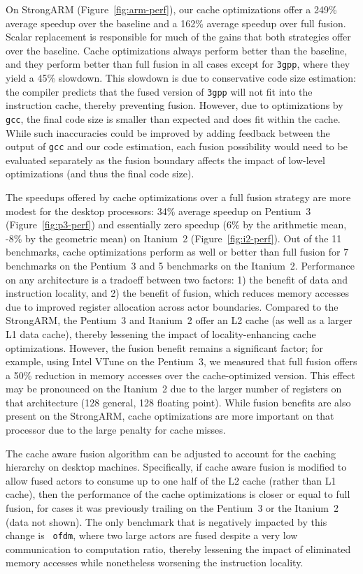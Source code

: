 \documentclass{sigplanconf}
\begin{document}
On StrongARM (Figure~\ref{fig:arm-perf}), our cache optimizations
offer a 249\% average speedup over the baseline and a 162\% average
speedup over full fusion.  Scalar replacement is responsible for much
of the gains that both strategies offer over the baseline.  Cache
optimizations always perform better than the baseline, and they
perform better than full fusion in all cases except for \texttt{3gpp},
where they yield a 45\% slowdown.  This slowdown is due to
conservative code size estimation: the compiler predicts that the
fused version of \texttt{3gpp} will not fit into the instruction
cache, thereby preventing fusion.  However, due to optimizations by
{\tt gcc}, the final code size is smaller than expected and does fit
within the cache.  While such inaccuracies could be improved by adding
feedback between the output of {\tt gcc} and our code estimation, each
fusion possibility would need to be evaluated separately as the fusion
boundary affects the impact of low-level optimizations (and thus the
final code size).

The speedups offered by cache optimizations over a full fusion
strategy are more modest for the desktop processors: 34\% average
speedup on Pentium~3 (Figure~\ref{fig:p3-perf}) and essentially zero
speedup (6\% by the arithmetic mean, -8\% by the geometric mean) on
Itanium~2 (Figure~\ref{fig:i2-perf}).  Out of the 11 benchmarks, cache
optimizations perform as well or better than full fusion for 7
benchmarks on the Pentium~3 and 5 benchmarks on the Itanium~2.
Performance on any architecture is a tradoeff between two factors: 1)
the benefit of data and instruction locality, and 2) the benefit of
fusion, which reduces memory accesses due to improved register
allocation across actor boundaries.  Compared to the StrongARM, the
Pentium~3 and Itanium~2 offer an L2 cache (as well as a larger L1 data
cache), thereby lessening the impact of locality-enhancing cache
optimizations.  However, the fusion benefit remains a significant
factor; for example, using Intel VTune on the Pentium~3, we measured
that full fusion offers a 50\% reduction in memory accesses over the
cache-optimized version.  This effect may be pronounced on the Itanium~2
due to the larger number of registers on that architecture (128
general, 128 floating point).  While fusion benefits are also present
on the StrongARM, cache optimizations are more important on that processor
due to the large penalty for cache misses.

The cache aware fusion algorithm can be adjusted to account for the
caching hierarchy on desktop machines.  Specifically, if cache aware
fusion is modified to allow fused actors to consume up to one half of
the L2 cache (rather than L1 cache), then the performance of the cache
optimizations is closer or equal to full fusion, for cases it was
previously trailing on the Pentium~3 or the Itanium~2 (data not shown).  The
only benchmark that is negatively impacted by this change is {\tt
ofdm}, where two large actors are fused despite a very low
communication to computation ratio, thereby lessening the impact of
eliminated memory accesses while nonetheless worsening the instruction
locality.
\end{document}
